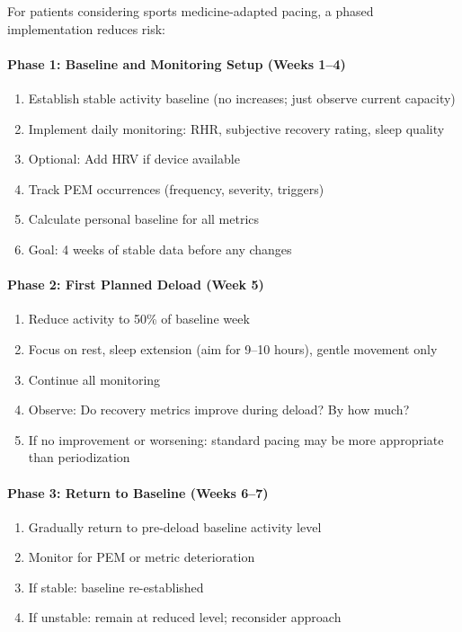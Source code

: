 For patients considering sports medicine-adapted pacing, a phased implementation reduces risk:

\paragraph{Phase 1: Baseline and Monitoring Setup (Weeks 1--4)}
\begin{enumerate}
    \item Establish stable activity baseline (no increases; just observe current capacity)
    \item Implement daily monitoring: RHR, subjective recovery rating, sleep quality
    \item Optional: Add HRV if device available
    \item Track PEM occurrences (frequency, severity, triggers)
    \item Calculate personal baseline for all metrics
    \item Goal: 4 weeks of stable data before any changes
\end{enumerate}

\paragraph{Phase 2: First Planned Deload (Week 5)}
\begin{enumerate}
    \item Reduce activity to 50\% of baseline week
    \item Focus on rest, sleep extension (aim for 9--10 hours), gentle movement only
    \item Continue all monitoring
    \item Observe: Do recovery metrics improve during deload? By how much?
    \item If no improvement or worsening: standard pacing may be more appropriate than periodization
\end{enumerate}

\paragraph{Phase 3: Return to Baseline (Weeks 6--7)}
\begin{enumerate}
    \item Gradually return to pre-deload baseline activity level
    \item Monitor for PEM or metric deterioration
    \item If stable: baseline re-established
    \item If unstable: remain at reduced level; reconsider approach
\end{enumerate}

